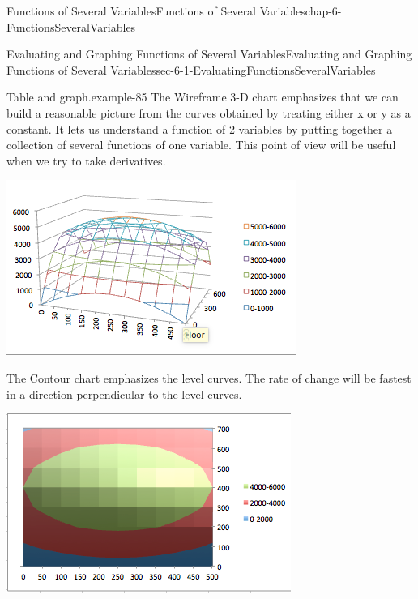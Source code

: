 \documentclass[oneside,10pt,]{book}
\numberwithin{equation}{section}
\begin{document}
\begin{chapterptx}{Functions of Several Variables}{}{Functions of Several Variables}{}{}{chap-6-FunctionsSeveralVariables}
\begin{sectionptx}{Evaluating and Graphing Functions of Several Variables}{}{Evaluating and Graphing Functions of Several Variables}{}{}{sec-6-1-EvaluatingFunctionsSeveralVariables}
\begin{example}{Table and graph.}{example-85}
\hypertarget{p-2142}{}%
The Wireframe 3-D chart emphasizes that we can build a reasonable picture from the curves obtained by treating either x or y as a constant.  It lets us understand a function of 2 variables by putting together a collection of several functions of one variable.  This point of view will be useful when we try to take derivatives.%
\begin{sidebyside}{1}{0.1}{0.1}{0}%
\begin{sbspanel}{0.8}%
\includegraphics[width=1\linewidth]{images/sec-6-1-12.png}
\end{sbspanel}%
\end{sidebyside}%
\par
\hypertarget{p-2143}{}%
The Contour chart emphasizes the level curves. The rate of change will be fastest in a direction perpendicular to the level curves.%
\begin{sidebyside}{1}{0.2}{0.2}{0}%
\begin{sbspanel}{0.6}%
\includegraphics[width=1\linewidth]{images/sec-6-1-13.png}

\end{sbspanel}
\end{sidebyside}
\end{example}
\end{sectionptx}
\end{chapterptx}
\end{document}
